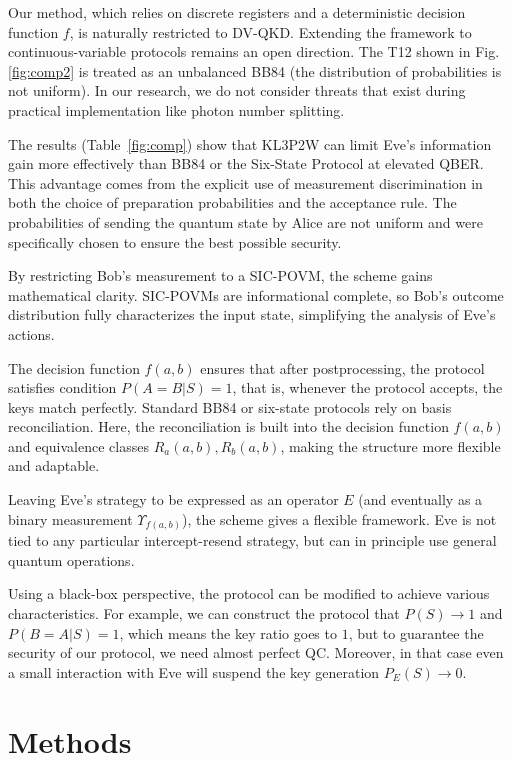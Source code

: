 \documentclass[a4paper,twocolumn,11pt,unpublished]{quantumarticle}
\begin{document}
Our method, which relies on discrete registers and a deterministic decision
function $f$, is naturally restricted to DV-QKD. Extending the framework to
continuous-variable protocols remains an open direction. The T12 \cite{T12}
shown in Fig. \ref{fig:comp2} is treated as an unbalanced BB84 (the distribution
of probabilities is not uniform).
In our research, we do not consider threats that exist during practical
implementation like photon number splitting. 

The results (Table~\ref{fig:comp}) show that KL3P2W can limit Eve's information
gain more effectively than BB84 or the Six-State Protocol \cite{SSP} at elevated
QBER. This advantage comes from the explicit use of measurement discrimination
in both the choice of preparation probabilities and the acceptance rule. The
probabilities of sending the quantum state by Alice are not uniform and were
specifically chosen to ensure the best possible security.

By restricting Bob’s measurement to a SIC-POVM, the scheme gains mathematical
clarity. SIC-POVMs are informational complete, so Bob's outcome distribution
fully characterizes the input state, simplifying the analysis of Eve’s
actions.

The decision function $f(a,b)$ ensures that after postprocessing, the protocol
satisfies condition $P(A=B|S)=1$, that is, whenever the protocol accepts, the
keys match perfectly. Standard BB84 or six-state protocols rely on basis
reconciliation. Here, the reconciliation is built into the decision function
$f(a,b)$ and equivalence classes $R_a(a,b),R_b(a,b)$, making the structure more
flexible and adaptable.

Leaving Eve's strategy to be expressed as an operator $E$ (and eventually as a
binary measurement $\Upsilon_{f(a,b)}$), the scheme gives a flexible framework.
Eve is not tied to any particular intercept-resend strategy, but can in
principle use general quantum operations.

Using a black-box perspective, the protocol can be modified to achieve various
characteristics. For example, we can construct the protocol that $P(S) \to 1$
and $P(B=A|S) = 1$, which means the key ratio goes to $1$, but to guarantee the
security of our protocol, we need almost perfect QC. Moreover, in that case even
a small interaction with Eve will suspend the key generation $P_E(S) \to 0$.


\section{Methods} 
\end{document}
